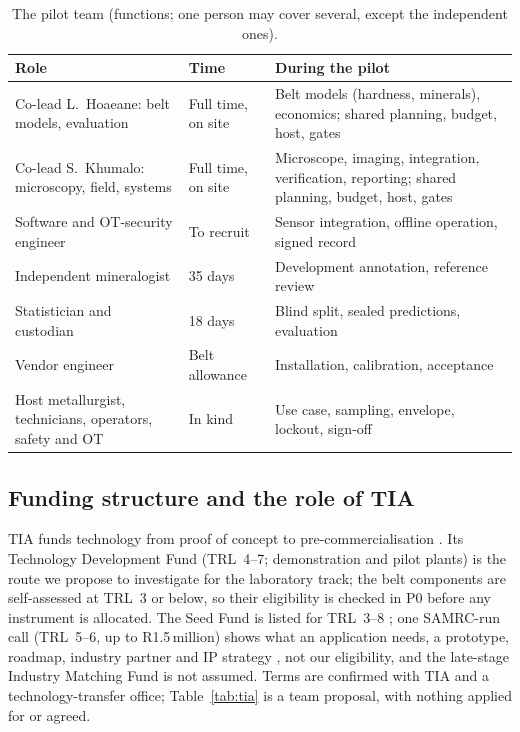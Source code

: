 \documentclass[10pt,a4paper,twocolumn]{article}
\begin{document}
\begin{table}[t]
\centering\footnotesize
\caption{The pilot team (functions; one person may cover several, except the independent ones).}
\label{tab:team}
\begin{tabularx}{\columnwidth}{@{}L{2.15cm}L{1.35cm}Y@{}}
\toprule
Role & Time & During the pilot \\
\midrule
Co-lead L.~Hoaeane: belt models, evaluation & Full time, on site & Belt models (hardness, minerals), economics; shared planning, budget, host, gates \\
Co-lead S.~Khumalo: microscopy, field, systems & Full time, on site & Microscope, imaging, integration, verification, reporting; shared planning, budget, host, gates \\
Software and OT-security engineer & To recruit & Sensor integration, offline operation, signed record \\
Independent mineralogist & 35 days & Development annotation, reference review \\
Statistician and custodian & 18 days & Blind split, sealed predictions, evaluation \\
Vendor engineer & Belt allowance & Installation, calibration, acceptance \\
Host metallurgist, technicians, operators, safety and OT & In kind & Use case, sampling, envelope, lockout, sign-off \\
\bottomrule
\end{tabularx}
\end{table}

\subsection{Funding structure and the role of TIA}\label{sec:tia}

TIA funds technology from proof of concept to pre-commercialisation \cite{tiafund}. Its Technology Development Fund (TRL~4--7; demonstration and pilot plants) is the route we propose to investigate for the laboratory track; the belt components are self-assessed at TRL~3 or below, so their eligibility is checked in P0 before any instrument is allocated. The Seed Fund is listed for TRL~3--8 \cite{tiafund}; one SAMRC-run call (TRL~5--6, up to R1.5\,million) shows what an application needs, a prototype, roadmap, industry partner and IP strategy \cite{tiaseed}, not our eligibility, and the late-stage Industry Matching Fund is not assumed. Terms are confirmed with TIA and a technology-transfer office; Table~\ref{tab:tia} is a team proposal, with nothing applied for or agreed.
\end{document}
